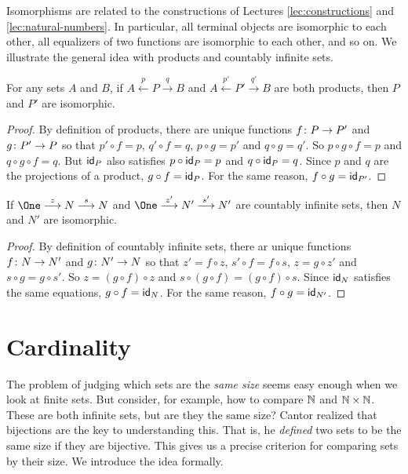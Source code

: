 Isomorphisms are related to the constructions of Lectures \ref{lec:constructions} and \ref{lec:natural-numbers}. 
In particular, all terminal objects are isomorphic to each other, all equalizers of two functions are isomorphic to each other, and so on. 
We illustrate the general idea with products and countably infinite sets. 

\begin{lemma}
	For any sets $A$ and $B$, if $A\stackrel{p}{\longleftarrow}P\stackrel{q}{\longrightarrow}B$ and
	$A\stackrel{p'}{\longleftarrow}P'\stackrel{q'}{\longrightarrow}B$
	are both products, then $P$ and $P'$ are isomorphic.
	
	\begin{proof}
		By definition of products, there are unique functions ${f}\colon{P}\to{P'}$
		and ${g}\colon{P'}\to{P}$ so that $p'\circ f = p$, $q'\circ f=q$, 
		$p\circ g = p'$ and $q\circ g = q'$. So $p\circ g\circ f = p$
		and $q\circ g\circ f = q$. But $\textsf{id}_P$ also satisfies $p\circ \textsf{id}_P = p$
		and $q\circ \textsf{id}_P = q$. Since $p$ and $q$ are the projections of a product,
		$g\circ f = \textsf{id}_P$. For the same reason, $f\circ g = \textsf{id}_{P'}$.
	\end{proof}
\end{lemma}

\begin{lemma}
	If $\One\stackrel{z}{\longrightarrow}N\stackrel{s}{\longrightarrow}N$ and $\One\stackrel{z'}{\longrightarrow}N'\stackrel{s'}{\longrightarrow}N'$ are countably infinite sets, then $N$ and $N'$ are isomorphic. 
	
	\begin{proof}
		By definition of countably infinite sets, there ar unique functions ${f}\colon{N}\to{N'}$ and ${g}\colon{N'}\to{N}$ so that $z'= f\circ z$, $s'\circ f=f\circ s$, $z=g\circ z'$ and $s\circ g=g\circ s'$.
		So $z = (g\circ f)\circ z$ and $s\circ (g\circ f) = (g\circ f)\circ s$.
		Since $\textsf{id}_N$ satisfies the same equations, $g\circ f = \textsf{id}_N$. For the same reason, $f\circ g = \textsf{id}_{N'}$.
	\end{proof}
\end{lemma}


\chapter{Cardinality}

The problem of judging which sets are the \emph{same size} seems easy enough when we look at finite sets. But consider, for example, how to compare $\mathbb N$ and $\mathbb N\times \mathbb N$. These are both infinite sets, but are they the same size?
Cantor realized that bijections are the key to understanding this. That is,
he \emph{defined} two sets to be the same size if they are bijective.
This gives us a precise criterion for comparing sets by their size. We introduce the idea formally.

